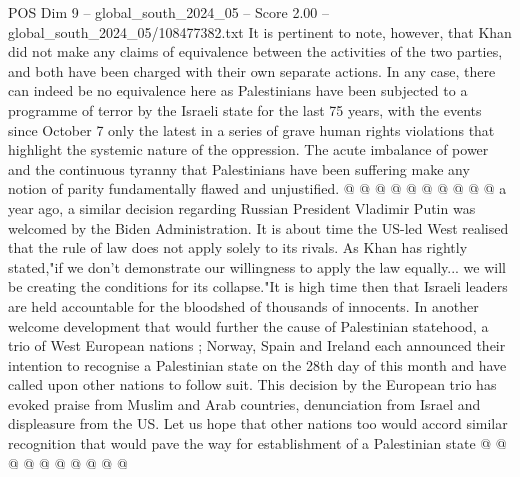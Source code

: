 \begin{textsample}{POS Dim 9 – global\_south\_2024\_05 – Score 2.00 – global\_south\_2024\_05/108477382.txt}
It is pertinent to note, however, that Khan did not make any claims of equivalence between the activities of the two parties, and both have been charged with their own separate actions.
In any case, there can indeed be no equivalence here as Palestinians have been subjected to a programme of terror by the Israeli state for the last 75 years, with the events since October 7 only the latest in a series of grave human rights violations that highlight the systemic nature of the oppression.
The acute imbalance of power and the continuous tyranny that Palestinians have been suffering make any notion of parity fundamentally flawed and unjustified. @ @ @ @ @ @ @ @ @ @ a year ago, a similar decision regarding Russian President Vladimir Putin was welcomed by the Biden Administration.
It is about time the US-led West realised that the rule of law does not apply solely to its rivals.
As Khan has rightly stated,"if we don't demonstrate our willingness to apply the law equally... we will be creating the conditions for its collapse."It is high time then that Israeli leaders are held accountable for the bloodshed of thousands of innocents.
In another welcome development that would further the cause of Palestinian statehood, a trio of West European nations ; Norway, Spain and Ireland each announced their intention to recognise a Palestinian state on the 28th day of this month and have called upon other nations to follow suit.
This decision by the European trio has evoked praise from Muslim and Arab countries, denunciation from Israel and displeasure from the US.
Let us hope that other nations too would accord similar recognition that would pave the way for establishment of a Palestinian state @ @ @ @ @ @ @ @ @ @

\end{textsample}
